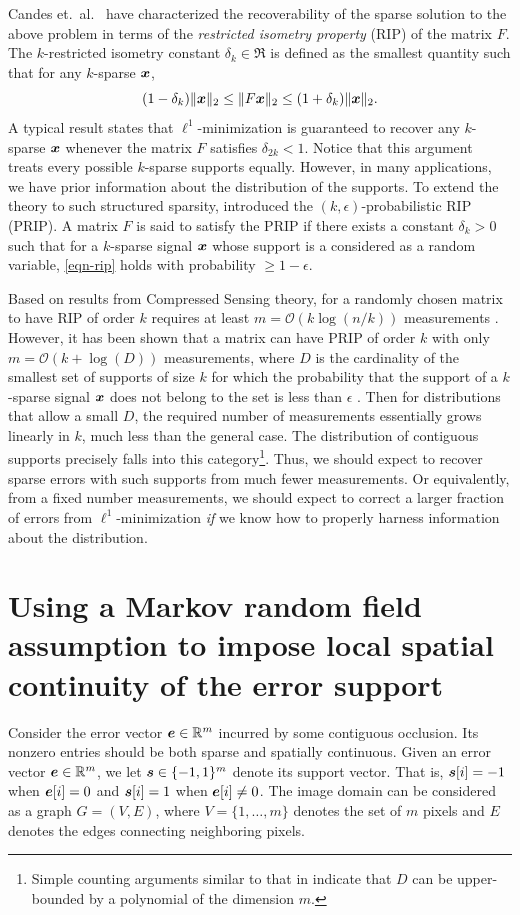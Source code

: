 Candes et.\ al.\ \cite{CandesE2005-IT} have characterized the recoverability of the sparse solution to the above problem in terms of the {\em restricted isometry property} (RIP) of the matrix $F$.
The $k$-restricted isometry constant $\delta_k \in \Re$ is defined as the smallest
quantity such that for any $k$-sparse ${\boldsymbol{x}}$,
\begin{equation}
(1-\delta_k)\|{\boldsymbol{x}}\|_2 \leq \|F{\boldsymbol{x}}\|_2 \leq (1+\delta_k)\|{\boldsymbol{x}}\|_2.
\label{eqn-rip}
\end{equation}
A typical result states that $\ell^1$-minimization is guaranteed to recover any $k$-sparse ${\boldsymbol{x}}$ whenever the matrix
$F$ satisfies $\delta_{2k}<1$. Notice that this argument treats every
possible $k$-sparse supports equally. However, in many
applications, we have prior information about the
distribution of the supports. To extend the theory to such
structured sparsity, \cite{Cevher2008-NIPS} introduced the
$(k,\epsilon)$-probabilistic RIP (PRIP). A matrix $F$ is said to
satisfy the PRIP if there exists a constant $\delta_k>0$ such that
for a $k$-sparse signal ${\boldsymbol{x}}$ whose support is a considered as a random variable, \eqref{eqn-rip} holds with probability $\ge 1-\epsilon$.

Based on results from Compressed Sensing theory, for a randomly chosen matrix to have RIP of order $k$ requires at least $m =\mathcal{O}(k\log(n/k))$ measurements \cite{CandesE2005-IT}. However, it has been shown that a matrix can have PRIP of order $k$ with only $m =\mathcal {O}(k + \log(D))$ measurements, where $D$ is the cardinality of the smallest set of supports of size $k$ for which the probability that the support of a $k$-sparse signal ${\boldsymbol{x}}$ does not belong to the set is less than $\epsilon$ \cite{Cevher2008-NIPS}. Then for distributions that allow a small $D$, the required number of measurements essentially grows linearly in $k$, much less than the general case. The distribution of contiguous supports precisely falls into this category\footnote{Simple counting arguments similar to that in \cite{Cevher2008-NIPS} indicate that $D$ can be upper-bounded by a polynomial of the dimension $m$.}. Thus, we should expect to recover sparse errors with such supports from much fewer measurements. Or equivalently, from a fixed number measurements, we should expect to correct a larger fraction of errors from $\ell^1$-minimization {\em if} we know how to properly harness information about the distribution.

\section{Using a Markov random field assumption to impose local spatial continuity of the error support}
Consider the error vector $\boldsymbol{e}\in \mathbb R^m$ incurred by some contiguous occlusion. Its nonzero entries should be both sparse and spatially continuous. Given an error vector $\boldsymbol{e}\in \mathbb R^m$, we let $\boldsymbol{s}\in \{-1,1\}^m$ denote its
support vector. That is, $\boldsymbol{s}[i] = -1$ when $\boldsymbol{e}[i] = 0$ and $\boldsymbol{s}[i] = 1$
when $\boldsymbol{e}[i] \neq 0$. The image domain can be considered as a graph
$G=(V,E)$, where $V = \{1,\dots,m\}$ denotes the set of $m$
pixels and $E$ denotes the edges connecting neighboring pixels.

